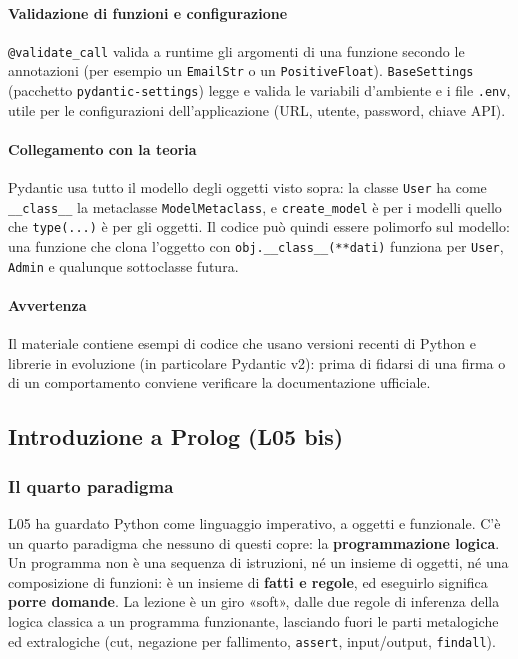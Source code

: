 \documentclass[a4paper,12pt]{article}
\begin{document}
\paragraph{Validazione di funzioni e configurazione} \texttt{@validate\_call} valida a
runtime gli argomenti di una funzione secondo le annotazioni (per esempio un
\texttt{EmailStr} o un \texttt{PositiveFloat}). \texttt{BaseSettings} (pacchetto
\texttt{pydantic-settings}) legge e valida le variabili d'ambiente e i file \texttt{.env}, utile
per le configurazioni dell'applicazione (URL, utente, password, chiave API).

\paragraph{Collegamento con la teoria} Pydantic usa tutto il modello degli oggetti visto sopra:
la classe \texttt{User} ha come \texttt{\_\_class\_\_} la metaclasse \texttt{ModelMetaclass}, e
\texttt{create\_model} è per i modelli quello che \texttt{type(...)} è per gli oggetti. Il
codice può quindi essere polimorfo sul modello: una funzione che clona l'oggetto con
\texttt{obj.\_\_class\_\_(**dati)} funziona per \texttt{User}, \texttt{Admin} e qualunque
sottoclasse futura.

\paragraph{Avvertenza} Il materiale contiene esempi di codice che usano versioni recenti di
Python e librerie in evoluzione (in particolare Pydantic v2): prima di fidarsi di una firma o
di un comportamento conviene verificare la documentazione ufficiale.

\subsection{Introduzione a Prolog (L05 bis)}

\subsubsection{Il quarto paradigma}
L05 ha guardato Python come linguaggio imperativo, a oggetti e funzionale. C'è un quarto
paradigma che nessuno di questi copre: la \textbf{programmazione logica}. Un programma non è una
sequenza di istruzioni, né un insieme di oggetti, né una composizione di funzioni: è un insieme
di \textbf{fatti e regole}, ed eseguirlo significa \textbf{porre domande}. La lezione è un giro
«soft», dalle due regole di inferenza della logica classica a un programma funzionante, lasciando
fuori le parti metalogiche ed extralogiche (cut, negazione per fallimento, \texttt{assert},
input/output, \texttt{findall}).
\end{document}
